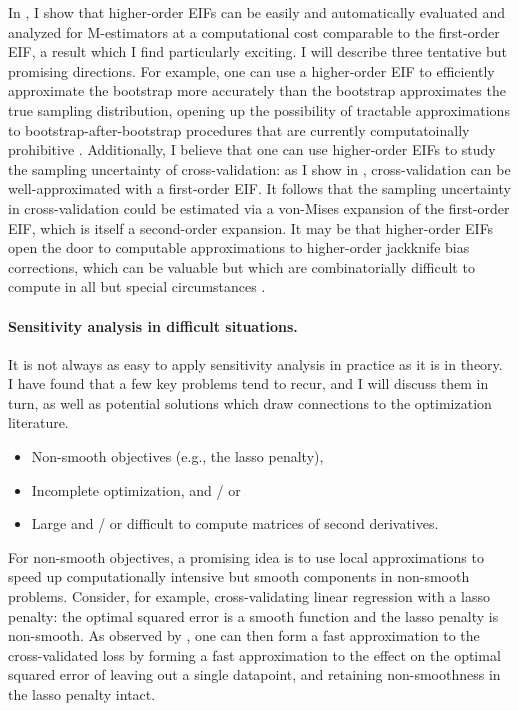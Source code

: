 In \citet{giordano:2019:hoij}, I show that higher-order EIFs can be easily and
automatically evaluated and analyzed for M-estimators at a computational cost
comparable to the first-order EIF, a result which I find particularly exciting.
I will describe three tentative but promising directions. For example, one can
use a higher-order EIF to efficiently approximate the bootstrap more accurately
than the bootstrap approximates the true sampling distribution, opening up the
possibility of tractable approximations to bootstrap-after-bootstrap procedures
that are currently computatoinally prohibitive \citep{shao:2012:jackknife}.
Additionally, I believe that one can use higher-order EIFs to study the sampling
uncertainty of cross-validation: as I show in \citet{giordano:2019:ij},
cross-validation can be well-approximated with a first-order EIF.  It follows
that the sampling uncertainty in cross-validation could be estimated via a
von-Mises expansion of the first-order EIF, which is itself a second-order
expansion.  It may be that higher-order EIFs open the door to computable
approximations to higher-order jackknife bias corrections, which can be valuable
but which are combinatorially difficult to compute in all but special
circumstances \citep{burnham:1978:jackknifebias}.


\paragraph{Sensitivity analysis in difficult situations.}

It is not always as easy to apply sensitivity analysis in practice as it is in
theory.  I have found that a few key problems tend to recur, and I will discuss
them in turn, as well as potential solutions which draw connections to the
optimization literature.
\begin{itemize}
    \item Non-smooth objectives (e.g., the lasso penalty),
    \item Incomplete optimization, and / or
    \item Large and / or difficult to compute matrices of second derivatives.
\end{itemize}

For non-smooth objectives, a promising idea is to use local approximations to
speed up computationally intensive but smooth components in non-smooth problems.
Consider, for example, cross-validating linear regression with a lasso penalty:
the optimal squared error is a smooth function and the lasso penalty is
non-smooth. As observed by \citet{wilson:2020:approximatecv}, one can then form
a fast approximation to the cross-validated loss by forming a fast approximation
to the effect on the optimal squared error of leaving out a single datapoint,
and retaining non-smoothness in the lasso penalty intact.

